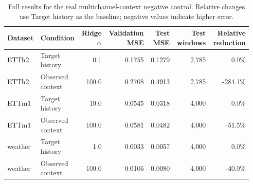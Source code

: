 
\begin{table}[t]
\centering
\caption{Full results for the real multichannel-context negative control. Relative changes use Target history as the baseline; negative values indicate higher error.}
\label{tab:natural-context-all}
\small
\begin{tabular}{@{}llrrrrr@{}}
\toprule
Dataset & Condition & Ridge $\alpha$ & Validation MSE & Test MSE & Test windows & Relative reduction\\
\midrule
ETTh2 & Target history & 0.1 & 0.1755 & 0.1279 & 2,785 & 0.0\% \\
ETTh2 & Observed context & 100.0 & 0.2708 & 0.4913 & 2,785 & -284.1\% \\
ETTm1 & Target history & 10.0 & 0.0545 & 0.0318 & 4,000 & 0.0\% \\
ETTm1 & Observed context & 100.0 & 0.0581 & 0.0482 & 4,000 & -51.5\% \\
weather & Target history & 1.0 & 0.0033 & 0.0057 & 4,000 & 0.0\% \\
weather & Observed context & 100.0 & 0.0106 & 0.0080 & 4,000 & -40.0\% \\
\bottomrule
\end{tabular}
\end{table}
